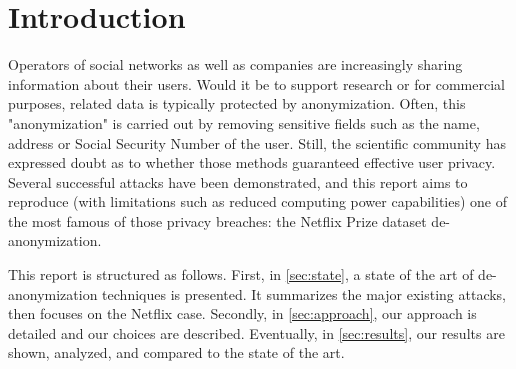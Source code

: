 \section{Introduction}

Operators of social networks as well as companies are increasingly sharing information about their users. Would it be to support research or for commercial purposes, related data is typically protected by anonymization. Often, this "anonymization" is carried out by removing sensitive fields such as the name, address or Social Security Number of the user. Still, the scientific community has expressed doubt as to whether those methods guaranteed effective user privacy. Several successful attacks have been demonstrated, and this report aims to reproduce (with limitations such as reduced computing power capabilities) one of the most famous of those privacy breaches: the Netflix Prize dataset de-anonymization.

This report is structured as follows. First, in \autoref{sec:state}, a state of the art of de-anonymization techniques is presented. It summarizes the major existing attacks, then focuses on the Netflix case. Secondly, in \autoref{sec:approach}, our approach is detailed and our choices are described. Eventually, in \autoref{sec:results}, our results are shown, analyzed, and compared to the state of the art. 
